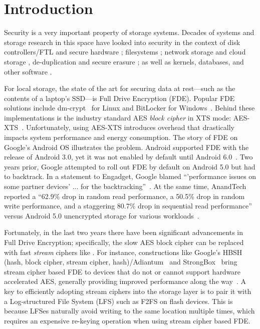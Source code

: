 \section{Introduction}\label{sec:introduction}


Security is a very important property of storage systems. Decades of systems and
storage research in this space have looked into security in the context of disk
controllers/FTL and secure hardware \cite{hardware1, hardware2, hardware3,
hardware4}; filesystems \cite{filesystems1, filesystems2, filesystems3,
filesystems4, filesystems5, filesystems6, filesystems7}; network storage and
cloud storage \cite{network1, network2, network3, network4, network5, network6,
network7, network8, network9, network10, network11, network12, network13,
network14, network15, network16}, de-duplication and secure erasure
\cite{erase1, erase2, erase3}; as well as kernels, databases, and other software
\cite{software1, software2, software3, software4}.

For local storage, the state of the art for securing data at rest---such as the
contents of a laptop's SSD---is Full Drive Encryption (FDE). Popular FDE
solutions include dm-crypt~\cite{dmcrypt, DmC-Android} for Linux and BitLocker
for Windows~\cite{bitlocker1, bitlocker2}. Behind these implementations is the
industry standard AES \emph{block cipher} in XTS mode: AES-XTS~\cite{XTS,
XTSComments, NISTXTS}. Unfortunately, using AES-XTS introduces overhead that
drastically impacts system performance and energy consumption. The story of FDE
on Google's Android OS illustrates the problem. Android supported FDE with the
release of Android 3.0, yet it was not enabled by default until Android
6.0~\cite{android-M-mobile-motivation}. Two years prior, Google attempted to
roll out FDE by default on Android 5.0 but had to backtrack. In a statement to
Engadget, Google blamed ``'performance issues on some partner devices' ... for
the backtracking''~\cite{google-engadget}. At the same time, AnandTech reported
a ``62.9\% drop in random read performance, a 50.5\% drop in random write
performance, and a staggering 80.7\% drop in sequential read performance''
versus Android 5.0 unencrypted storage for various
workloads~\cite{android-M-mobile-motivation-2}.

Fortunately, in the last two years there have been significant advancements in
Full Drive Encryption; specifically, the slow AES block cipher can be replaced
with fast {\em stream} ciphers like \encB. For instance, constructions like
Google's HBSH (hash, block cipher, stream cipher, hash)/Adiantum~\cite{Adiantum}
and StrongBox~\cite{StrongBox} bring stream cipher based FDE to devices that do
not or cannot support hardware accelerated AES, generally providing improved
performance along the way~\cite{StrongBox}. A key to efficiently adopting stream
ciphers into the storage layer is to pair it with a Log-structured File System
(LFS) such as F2FS on flash devices. This is because LFSes naturally avoid
writing to the same location multiple times, which requires an expensive
re-keying operation when using stream cipher based FDE.

